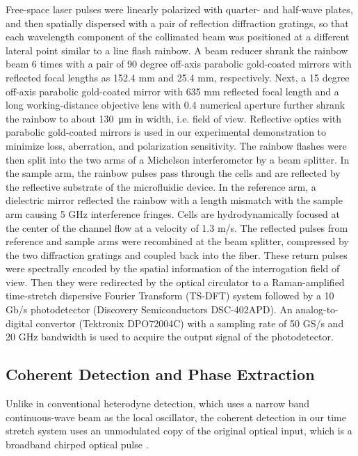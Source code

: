 \documentclass[aps,pra,reprint,superscriptaddress]{revtex4-1}
\begin{document}
Free-space laser pulses were linearly polarized with quarter- and half-wave plates, and then spatially dispersed with a pair of reflection diffraction gratings, so that each wavelength component of the collimated beam was positioned at a different lateral point similar to a line flash rainbow. A beam reducer shrank the rainbow beam 6 times with a pair of 90 degree off-axis parabolic gold-coated mirrors with reflected focal lengths as 152.4 mm and 25.4 mm, respectively. Next, a 15 degree off-axis parabolic gold-coated mirror with 635 mm reflected focal length and a long working-distance objective lens with 0.4 numerical aperture further shrank the rainbow to about \SI{130}{\micro\meter} in width, i.e. field of view. Reflective optics with parabolic gold-coated mirrors is used in our experimental demonstration to minimize loss, aberration, and polarization sensitivity. The rainbow flashes were then split into the two arms of a Michelson interferometer by a beam splitter. In the sample arm, the rainbow pulses pass through the cells and are reflected by the reflective substrate of the microfluidic device. In the reference arm, a dielectric mirror reflected the rainbow with a length mismatch with the sample arm causing 5 GHz interference fringes. Cells are hydrodynamically focused at the center of the channel flow at a velocity of 1.3 m/s. The reflected pulses from reference and sample arms were recombined at the beam splitter, compressed by the two diffraction gratings and coupled back into the fiber. These return pulses were spectrally encoded by the spatial information of the interrogation field of view. Then they were redirected by the optical circulator to a Raman-amplified time-stretch dispersive Fourier Transform (TS-DFT) system followed by a 10 Gb/s photodetector (Discovery Semiconductors DSC-402APD). An analog-to-digital convertor (Tektronix DPO72004C) with a sampling rate of 50 GS/s and 20 GHz bandwidth is used to acquire the output signal of the photodetector.

\subsection{Coherent Detection and Phase Extraction}

Unlike in conventional heterodyne detection, which uses a narrow band continuous-wave beam as the local oscillator, the coherent detection in our time stretch system uses an unmodulated copy of the original optical input, which is a broadband chirped optical pulse \cite{buckley2013coherent, devore2014coherent}. 
\end{document}
